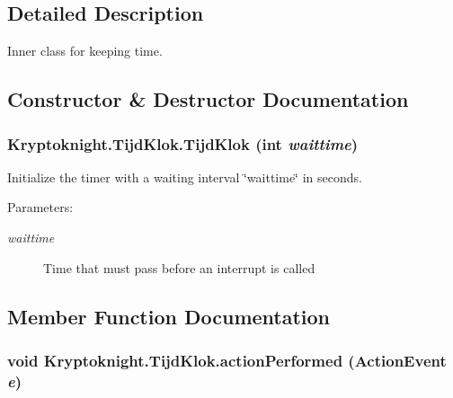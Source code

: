 \subsection{Detailed Description}
Inner class for keeping time. 



\subsection{Constructor \& Destructor Documentation}
\hypertarget{class_kryptoknight_1_1_tijd_klok_c0}{
\subsubsection[TijdKlok]{\setlength{\rightskip}{0pt plus 5cm}Kryptoknight.Tijd\-Klok.Tijd\-Klok (int {\em waittime})}}
\label{class_kryptoknight_1_1_tijd_klok_c0}


Initialize the timer with a waiting interval \char`\"{}waittime\char`\"{} in seconds. \begin{Desc}
\item[Parameters:]
\begin{description}
\item[{\em waittime}]Time that must pass before an interrupt is called \end{description}
\end{Desc}


\subsection{Member Function Documentation}
\hypertarget{class_kryptoknight_1_1_tijd_klok_a0}{
\subsubsection[actionPerformed]{\setlength{\rightskip}{0pt plus 5cm}void Kryptoknight.Tijd\-Klok.action\-Performed (Action\-Event {\em e})}}
\label{class_kryptoknight_1_1_tijd_klok_a0}


